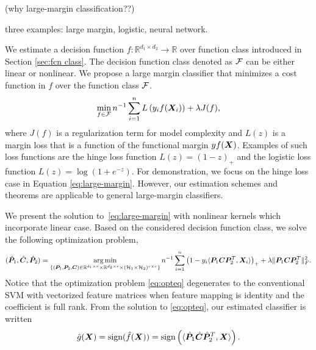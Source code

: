 \documentclass[mathptm]{statsoc}
\begin{document}
 (why large-margin classification??)
 
 three examples: large margin, logistic, neural network.

\label{subsec:pb1}
We estimate a decision function $f\colon\mathbb{R}^{d_1\times d_2}\rightarrow \mathbb{R}$ over function class introduced in Section \ref{sec:fcn class}. The decision function class denoted as $\mathcal{F}$ can be either linear or nonlinear. 
We propose a large margin classifier that minimizes a cost function in $f$ over the function class $\mathcal{F}$.
\begin{align}
\label{eq:large-margin}
\min_{f\in\mathcal{F}}n^{-1}\sum_{i=1}^n L\left(y_i f(\bm X_i)\right)+\lambda J(f),
\end{align}
where $J(f)$ is a regularization term for model complexity and $L(z)$ is a margin loss that is a function of the functional margin $yf(\bm X)$. Examples of such loss functions are the hinge loss function $L(z) = (1-z)_+$ and the logistic loss function $L(z) =\log(1+e^{-z})$.  For demonstration, we focus on the hinge loss case in Equation \eqref{eq:large-margin}. However, our estimation schemes and theorems are applicable to general large-margin classifiers.

We present the solution to~\eqref{eq:large-margin} with nonlinear kernels which incorporate linear case. Based on the considered decision function class, we solve the following optimization problem,
\begin{align}
\label{eq:opteq}
(\hat {\bm{P}}_1,\hat{\bm C},\hat{\bm{P}}_2) = \operatorname*{arg\,min}_{\{(\bm{P}_1,\bm{P}_2,\bm C)\in\mathbb{R}^{d_1\times r}\times \mathbb{R}^{d_2\times r}\times (\mathcal{H}_1\times \mathcal{H}_2)^{r\times r}\}}n^{-1}\sum_{i=1}^n \left(1-y_i\langle \bm{P}_1\bm C\bm{P}_2^T,\bm X_i\rangle\right)_++\lambda \lVert\bm{P}_1\bm C\bm{P}_2^T\rVert_F^2.
\end{align}
Notice that the optimization problem \eqref{eq:opteq} degenerates to the conventional SVM with vectorized feature matrices when feature mapping is identity and the coefficient is full rank. From the solution to \eqref{eq:opteq}, our estimated classifier is written 
\begin{align}\label{eq:formulation}\hat g(\bm X) = \text{sign}(\hat f(\bm X)) =  \text{sign}\left(\langle \hat{\bm{P}}_1\hat{\bm C}\hat{\bm{P}}_2^T,\bm X\rangle\right).\end{align}
\end{document}
